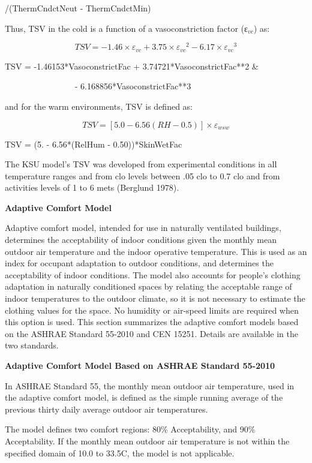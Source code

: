 /(ThermCndctNeut - ThermCndctMin)

Thus, TSV in the cold is a function of a vasoconstriction factor (ε\(_{vc}\)) as:

\begin{equation}
TSV =  - 1.46 \times {\varepsilon_{vc}} + 3.75 \times {\varepsilon_{vc}}^2 - 6.17 \times {\varepsilon_{vc}}^3
\end{equation}

TSV = -1.46153*VasoconstrictFac + 3.74721*VasoconstrictFac**2 \&

~~~~~~~~~~~~~~~~ - 6.168856*VasoconstrictFac**3

and for the warm environments, TSV is defined as:

\begin{equation}
TSV = [5.0 - 6.56(RH - 0.5)] \times {\varepsilon_{wsw}}
\end{equation}

TSV = (5. - 6.56*(RelHum - 0.50))*SkinWetFac

The KSU model's TSV was developed from experimental conditions in all temperature ranges and from clo levels between .05 clo to 0.7 clo and from activities levels of 1 to 6 mets (Berglund 1978).

\textbf{Adaptive Comfort Model}

Adaptive comfort model, intended for use in naturally ventilated buildings, determines the acceptability of indoor conditions given the monthly mean outdoor air temperature and the indoor operative temperature. This is used as an index for occupant adaptation to outdoor conditions, and determines the acceptability of indoor conditions. The model also accounts for people's clothing adaptation in naturally conditioned spaces by relating the acceptable range of indoor temperatures to the outdoor climate, so it is not necessary to estimate the clothing values for the space. No humidity or air-speed limits are required when this option is used. This section summarizes the adaptive comfort models based on the ASHRAE Standard 55-2010 and CEN 15251. Details are available in the two standards.

\textbf{Adaptive Comfort Model Based on ASHRAE Standard 55-2010}

In ASHRAE Standard 55, the monthly mean outdoor air temperature, used in the adaptive comfort model, is defined as the simple running average of the previous thirty daily average outdoor air temperatures.

The model defines two comfort regions: 80\% Acceptability, and 90\% Acceptability. If the monthly mean outdoor air temperature is not within the specified domain of 10.0 to 33.5C, the model is not applicable.

